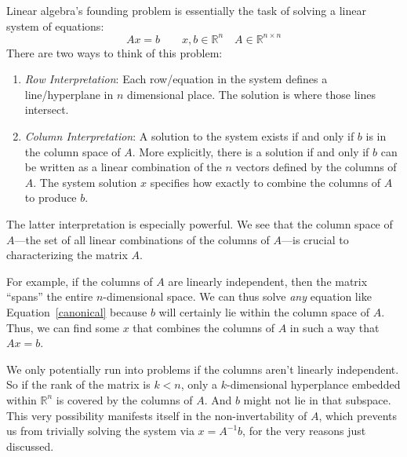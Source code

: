 \documentclass[12pt]{article}
\numberwithin{equation}{section} %
\theoremstyle{plain}
\theoremstyle{definition}
\newtheorem{defn}[thm]{Definition}
\theoremstyle{remark}
\newcommand{\Rn}{\mathbb{R}^n}
\newcommand{\Rnn}{\mathbb{R}^{n\times n}}
\begin{document}
Linear algebra's founding problem is essentially the task of solving a
linear system of equations:
\begin{equation}
    \label{canonical}
    Ax = b
    \qquad x,b\in \Rn
    \quad A \in \Rnn
\end{equation}
There are two ways to think of this problem:
\begin{enumerate}
  \item {\sl Row Interpretation}:
    Each row/equation in the system defines a line/hyperplane in $n$
    dimensional place. The solution is where those lines intersect.
  \item {\sl Column Interpretation}:
    A solution to the system exists if and only if $b$ is in the
    column space of $A$. More explicitly, there is a solution if and
    only if $b$ can be written as a linear combination of the $n$
    vectors defined by the columns of $A$.
    The system solution $x$ specifies how exactly to combine the columns
    of $A$ to produce $b$.
\end{enumerate}
The latter interpretation is especially powerful. We see that the column
space of $A$---the set of all linear combinations of the columns of
$A$---is crucial to characterizing the matrix $A$.

For example, if the columns of $A$ are linearly independent, then the
matrix ``spans'' the entire $n$-dimensional space. We can thus solve
\emph{any} equation like Equation~\ref{canonical} because $b$ will
certainly lie within the column space of $A$. Thus, we can find some $x$
that combines the columns of $A$ in such a way that $Ax=b$.

We only potentially run into problems if the columns aren't linearly
independent. So if the rank of the matrix is $k<n$, only a
$k$-dimensional hyperplance embedded within $\mathbb{R}^n$ is covered by
the columns of $A$. And $b$ might not lie in that subspace. This very
possibility manifests itself in the non-invertability of $A$, which
prevents us from trivially solving the system via $x = A^{-1}b$, for the
very reasons just discussed.


\end{document}
